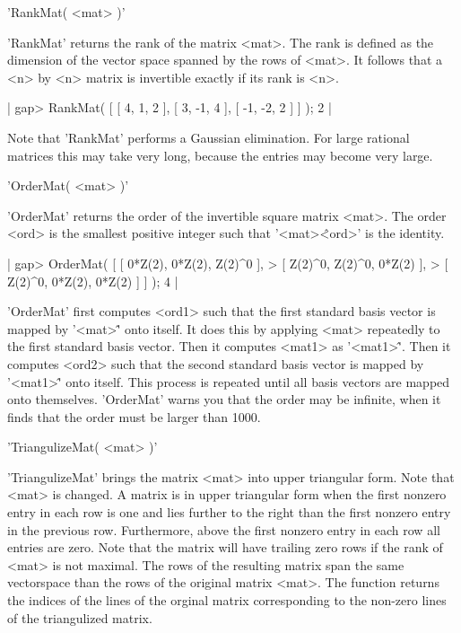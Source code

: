 'RankMat( <mat> )'

'RankMat'  returns the  rank of the matrix <mat>.  The rank is defined as
the  dimension  of the vector  space spanned by the rows  of  <mat>.   It
follows  that  a <n> by  <n>  matrix is invertible exactly if its rank is
<n>.

|    gap> RankMat( [ [ 4, 1, 2 ], [ 3, -1, 4 ], [ -1, -2, 2 ] ] );
    2 |

Note that 'RankMat' performs a  Gaussian elimination.  For large rational
matrices  this  may take  very long, because the  entries may become very
large.


'OrderMat( <mat> )'

'OrderMat' returns  the order of the invertible square matrix <mat>.  The
order <ord> is the smallest positive integer such  that '<mat>\^<ord>' is
the identity.

|    gap> OrderMat( [ [ 0*Z(2), 0*Z(2), Z(2)^0 ],
    >                 [ Z(2)^0, Z(2)^0, 0*Z(2) ],
    >                 [ Z(2)^0, 0*Z(2), 0*Z(2) ] ] );
    4 |

'OrderMat'  first  computes <ord1>  such that  the first  standard  basis
vector  is  mapped  by  '<mat>\^<ord1>' onto  itself.   It  does this  by
applying <mat> repeatedly to the  first standard basis  vector.   Then it
computes <mat1> as '<mat1>\^<ord1>'.   Then it  computes <ord2> such that
the second  standard  basis vector is  mapped  by  '<mat1>\^<ord2>'  onto
itself.  This process is repeated until all basis vectors are mapped onto
themselves.  'OrderMat' warns you that the order may be infinite, when it
finds that the order must be larger than 1000.


'TriangulizeMat( <mat> )'

'TriangulizeMat'  brings the matrix <mat>  into upper triangular form. Note
that  <mat> is changed. A matrix is in upper triangular form when the first
nonzero  entry in each  row is one  and lies further  to the right than the
first  nonzero  entry  in  the  previous  row. Furthermore, above the first
nonzero  entry in each row all entries  are zero. Note that the matrix will
have  trailing zero rows if  the rank of <mat>  is not maximal. The rows of
the  resulting  matrix  span  the  same  vectorspace  than  the rows of the
original matrix <mat>. The function returns the indices of the lines of the
orginal  matrix  corresponding  to  the  non-zero lines of the triangulized
matrix.

